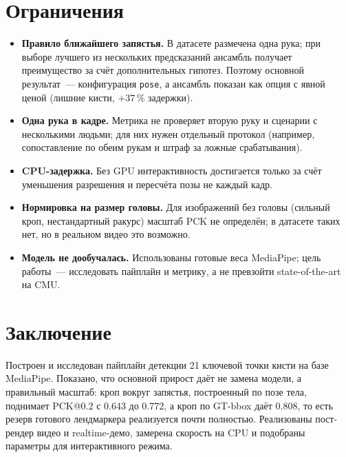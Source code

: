 \documentclass[11pt,a4paper]{article}
\newcommand{\PckFull}{0.643}
\newcommand{\PckOracle}{0.808}
\newcommand{\PckPose}{0.772}
\begin{document}
\section{Ограничения}
\label{sec:limits}

\begin{itemize}
  \item \textbf{Правило ближайшего запястья.} В датасете размечена одна рука;
        при выборе лучшего из нескольких предсказаний ансамбль получает
        преимущество за счёт дополнительных гипотез. Поэтому основной
        результат~--- конфигурация \texttt{pose}, а ансамбль показан как
        опция с явной ценой (лишние кисти, \(+37\,\%\) задержки).
  \item \textbf{Одна рука в кадре.} Метрика не проверяет вторую руку и
        сценарии с несколькими людьми; для них нужен отдельный протокол
        (например, сопоставление по обеим рукам и штраф за ложные срабатывания).
  \item \textbf{CPU-задержка.} Без GPU интерактивность достигается только
        за счёт уменьшения разрешения и пересчёта позы не каждый кадр.
  \item \textbf{Нормировка на размер головы.} Для изображений без головы
        (сильный кроп, нестандартный ракурс) масштаб PCK не определён; в
        датасете таких нет, но в реальном видео это возможно.
  \item \textbf{Модель не дообучалась.} Использованы готовые веса MediaPipe;
        цель работы~--- исследовать пайплайн и метрику, а не превзойти
        state-of-the-art на CMU.
\end{itemize}

\section{Заключение}

Построен и исследован пайплайн детекции 21 ключевой точки кисти на базе
MediaPipe. Показано, что основной прирост даёт не замена модели, а правильный
масштаб: кроп вокруг запястья, построенный по позе тела, поднимает PCK@0.2
с \PckFull{} до \PckPose{}, а кроп по GT-bbox даёт \PckOracle{}, то есть
резерв готового лендмаркера реализуется почти полностью. Реализованы
пост-рендер видео и realtime-демо, замерена скорость на CPU и подобраны
параметры для интерактивного режима.
\end{document}
